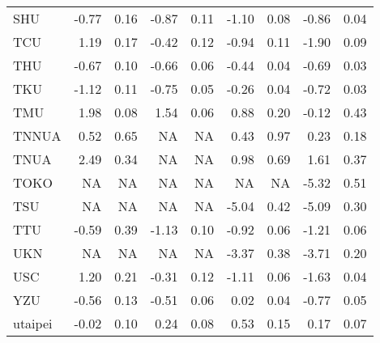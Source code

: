 \begin{longtable}[t]{lrrrrrrrr}
\hspace{1em}SHU & -0.77 & 0.16 & -0.87 & 0.11 & -1.10 & 0.08 & -0.86 & 0.04\\
\hspace{1em}TCU & 1.19 & 0.17 & -0.42 & 0.12 & -0.94 & 0.11 & -1.90 & 0.09\\
\hspace{1em}THU & -0.67 & 0.10 & -0.66 & 0.06 & -0.44 & 0.04 & -0.69 & 0.03\\
\hspace{1em}TKU & -1.12 & 0.11 & -0.75 & 0.05 & -0.26 & 0.04 & -0.72 & 0.03\\
\hspace{1em}TMU & 1.98 & 0.08 & 1.54 & 0.06 & 0.88 & 0.20 & -0.12 & 0.43\\
\hspace{1em}TNNUA & 0.52 & 0.65 & NA & NA & 0.43 & 0.97 & 0.23 & 0.18\\
\hspace{1em}TNUA & 2.49 & 0.34 & NA & NA & 0.98 & 0.69 & 1.61 & 0.37\\
\hspace{1em}TOKO & NA & NA & NA & NA & NA & NA & -5.32 & 0.51\\
\hspace{1em}TSU & NA & NA & NA & NA & -5.04 & 0.42 & -5.09 & 0.30\\
\hspace{1em}TTU & -0.59 & 0.39 & -1.13 & 0.10 & -0.92 & 0.06 & -1.21 & 0.06\\
\hspace{1em}UKN & NA & NA & NA & NA & -3.37 & 0.38 & -3.71 & 0.20\\
\hspace{1em}USC & 1.20 & 0.21 & -0.31 & 0.12 & -1.11 & 0.06 & -1.63 & 0.04\\
\hspace{1em}YZU & -0.56 & 0.13 & -0.51 & 0.06 & 0.02 & 0.04 & -0.77 & 0.05\\
\hspace{1em}utaipei & -0.02 & 0.10 & 0.24 & 0.08 & 0.53 & 0.15 & 0.17 & 0.07\\*
\end{longtable}
